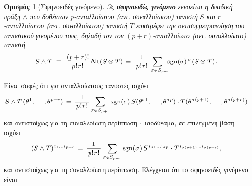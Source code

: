 \documentclass[11pt,a4paper,twoside,openright]{book}
\newtheorem{definition}[lemma]{Ορισμός}
\begin{document}
\begin{definition}[Σφηνοειδές γινόμενο]\label{def:wedge-product}
Ως \textbf{σφηνοειδές γινόμενο} εννοείται η δυαδική πράξη $\wedge$ που δοθέντων $p$-ανταλλοίωτου (αντ. συναλλοίωτου) τανυστή $S$ και $r$-ανταλλοίωτου (αντ. συναλλοίωτου) τανυστή $Τ$ επιστρέφει την αντισυμμετροποίηση του τανυστικού γινομένου τους, δηλαδή τον τον $(p+r)$-ανταλλοίωτο (αντ. συναλλοίωτο) τανυστή
\begin{equation}\label{eq:wedge-product}
S \wedge T
\,\,\equiv\,\,
\frac{(p+r)!}{\,p\hspace{.5pt}!\hspace{.5pt}r\hspace{.5pt}!\,}
\,
\textup{\textsf{Alt}}\hspace{.5pt}(S \otimes T)\,=\,
\frac{1}{\,p\hspace{.5pt}!\hspace{.5pt}r\hspace{.5pt}!\,}
\hspace{-8pt}
\sum_{\,\,\,\,\,\,\sigma \in S_{p+r}}
\hspace{-5pt}
\operatorname{sgn}(\sigma)
\,
{}^\sigma\hspace{.2pt}(S \otimes T)\,.
\end{equation}
\end{definition}
\noindent
Είναι σαφές ότι για ανταλλοίωτους τανυστές ισχύει
\begin{equation}\label{eq:wedge-product-analytic}
S \wedge T \,(\theta^1, \dots, \theta^{p+r})
\,=\,
\frac{1}{\,p\hspace{.5pt}!\hspace{.5pt}r\hspace{.5pt}!\,}
\sum_{\sigma \in S_{p+r}}
\operatorname{sgn}(\sigma)
\,
S(\theta^{\sigma 1}, \dots, \theta^{\sigma p})
\cdot
T(\theta^{\sigma (p+1)}, \dots, \theta^{\sigma (p+r)})
\end{equation}
και αντιστοίχως για τη συναλλοίωτη περίπτωση·
ισοδύναμα, σε επιλεγμένη βάση ισχύει
\begin{equation}\label{eq:wedge-contravariant-quantities}
(S \wedge T)^{\,i_1 \dots i_{p+r}}
\,=\,
\frac{1}{\,p\hspace{.5pt}!\hspace{.5pt}r\hspace{.5pt}!\,}
\sum_{\sigma \in S_{p+r}}
\operatorname{sgn}(\sigma)
\,
S^{\,i_{\sigma 1} \dots i_{\sigma p}}
\cdot
T^{\,i_{\sigma (p+1)} \dots i_{\sigma (p+r)}},
\end{equation}
και αντιστοίχως για τη συναλλοίωτη περίπτωση.
Ελέγχεται ότι το σφηνοειδές γινόμενο είναι
\end{document}
